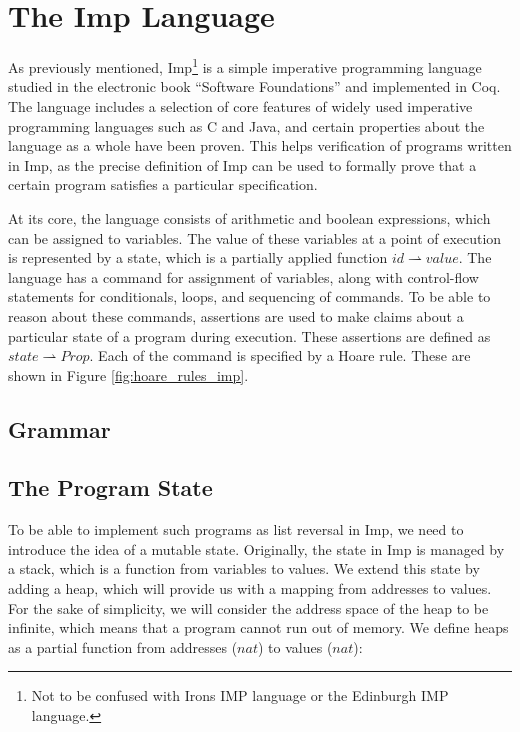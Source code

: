 \section{The Imp Language}
\label{sec:background_imp}
As previously mentioned, Imp\footnote{Not to be confused with Irons IMP language or the Edinburgh IMP language.} is a simple imperative programming language studied in the electronic book ``Software Foundations'' and implemented in Coq. The language includes a selection of core features of widely used imperative programming languages such as C and Java, and certain properties about the language as a whole have been proven. This helps verification of programs written in Imp, as the precise definition of Imp can be used to formally prove that a certain program satisfies a particular specification. 

At its core, the language consists of arithmetic and boolean expressions, which can be assigned to variables. The value of these variables at a point of execution is represented by a state, which is a partially applied function $id \rightharpoonup value$. The language has a command for assignment of variables, along with control-flow statements for conditionals, loops, and sequencing of commands. To be able to reason about these commands, assertions are used to make claims about a particular state of a program during execution. These assertions are defined as $state \rightharpoonup Prop$. Each of the command is specified by a Hoare rule. These are shown in Figure \ref{fig:hoare_rules_imp}.

\subsection{Grammar}
\subsection{The Program State}
To be able to implement such programs as list reversal in Imp, we need to introduce the idea of a mutable state. Originally, the state in Imp is managed by a stack, which is a function from variables to values. We extend this state by adding a heap, which will provide us with a mapping from addresses to values. For the sake of simplicity, we will consider the address space of the heap to be infinite, which means that a program cannot run out of memory. We define heaps as a partial function from addresses ($nat$) to values ($nat$):

